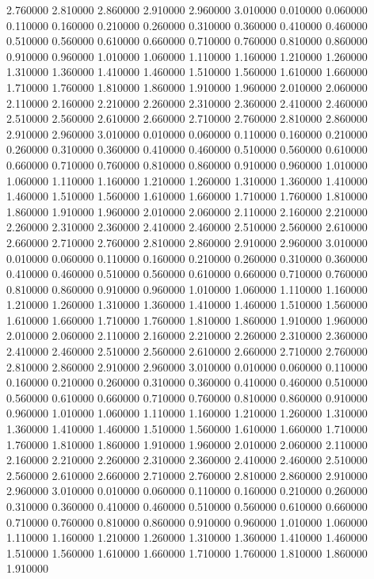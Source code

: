2.760000
2.810000
2.860000
2.910000
2.960000
3.010000
0.010000
0.060000
0.110000
0.160000
0.210000
0.260000
0.310000
0.360000
0.410000
0.460000
0.510000
0.560000
0.610000
0.660000
0.710000
0.760000
0.810000
0.860000
0.910000
0.960000
1.010000
1.060000
1.110000
1.160000
1.210000
1.260000
1.310000
1.360000
1.410000
1.460000
1.510000
1.560000
1.610000
1.660000
1.710000
1.760000
1.810000
1.860000
1.910000
1.960000
2.010000
2.060000
2.110000
2.160000
2.210000
2.260000
2.310000
2.360000
2.410000
2.460000
2.510000
2.560000
2.610000
2.660000
2.710000
2.760000
2.810000
2.860000
2.910000
2.960000
3.010000
0.010000
0.060000
0.110000
0.160000
0.210000
0.260000
0.310000
0.360000
0.410000
0.460000
0.510000
0.560000
0.610000
0.660000
0.710000
0.760000
0.810000
0.860000
0.910000
0.960000
1.010000
1.060000
1.110000
1.160000
1.210000
1.260000
1.310000
1.360000
1.410000
1.460000
1.510000
1.560000
1.610000
1.660000
1.710000
1.760000
1.810000
1.860000
1.910000
1.960000
2.010000
2.060000
2.110000
2.160000
2.210000
2.260000
2.310000
2.360000
2.410000
2.460000
2.510000
2.560000
2.610000
2.660000
2.710000
2.760000
2.810000
2.860000
2.910000
2.960000
3.010000
0.010000
0.060000
0.110000
0.160000
0.210000
0.260000
0.310000
0.360000
0.410000
0.460000
0.510000
0.560000
0.610000
0.660000
0.710000
0.760000
0.810000
0.860000
0.910000
0.960000
1.010000
1.060000
1.110000
1.160000
1.210000
1.260000
1.310000
1.360000
1.410000
1.460000
1.510000
1.560000
1.610000
1.660000
1.710000
1.760000
1.810000
1.860000
1.910000
1.960000
2.010000
2.060000
2.110000
2.160000
2.210000
2.260000
2.310000
2.360000
2.410000
2.460000
2.510000
2.560000
2.610000
2.660000
2.710000
2.760000
2.810000
2.860000
2.910000
2.960000
3.010000
0.010000
0.060000
0.110000
0.160000
0.210000
0.260000
0.310000
0.360000
0.410000
0.460000
0.510000
0.560000
0.610000
0.660000
0.710000
0.760000
0.810000
0.860000
0.910000
0.960000
1.010000
1.060000
1.110000
1.160000
1.210000
1.260000
1.310000
1.360000
1.410000
1.460000
1.510000
1.560000
1.610000
1.660000
1.710000
1.760000
1.810000
1.860000
1.910000
1.960000
2.010000
2.060000
2.110000
2.160000
2.210000
2.260000
2.310000
2.360000
2.410000
2.460000
2.510000
2.560000
2.610000
2.660000
2.710000
2.760000
2.810000
2.860000
2.910000
2.960000
3.010000
0.010000
0.060000
0.110000
0.160000
0.210000
0.260000
0.310000
0.360000
0.410000
0.460000
0.510000
0.560000
0.610000
0.660000
0.710000
0.760000
0.810000
0.860000
0.910000
0.960000
1.010000
1.060000
1.110000
1.160000
1.210000
1.260000
1.310000
1.360000
1.410000
1.460000
1.510000
1.560000
1.610000
1.660000
1.710000
1.760000
1.810000
1.860000
1.910000
